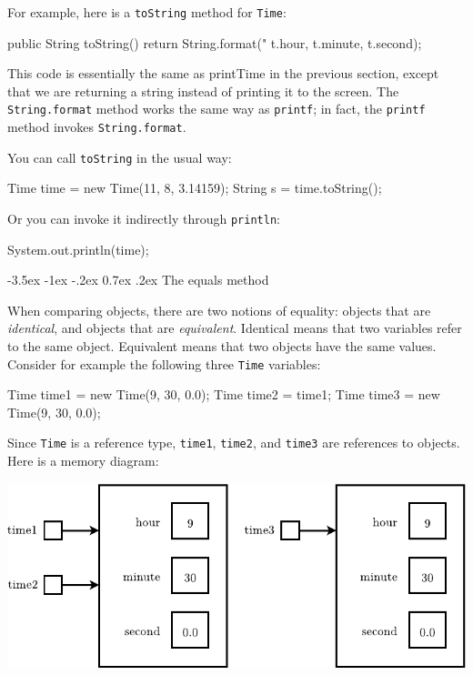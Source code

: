 \documentclass[12pt]{book}
\makeatletter
\theoremstyle{exercise}
\newcommand{\java}[1]{\verb"#1"}
\renewcommand{\section}{\@startsection {section}{1}{\z@}%
    {-3.5ex \@plus -1ex \@minus -.2ex}%
    {0.7ex \@plus.2ex}%
    {\normalfont\Large\bfseries}}
\newcommand{\java}[1]{\lstinline{#1}} %
\makeatother
\begin{document}
For example, here is a \java{toString} method for \java{Time}:

\begin{code}
public String toString() {
    return String.format("%
            t.hour, t.minute, t.second);
}
\end{code}

This code is essentially the same as printTime in the previous section, except that we are returning a string instead of printing it to the screen.
The \java{String.format} method works the same way as \java{printf}; in fact, the \java{printf} method invokes \java{String.format}.

You can call \java{toString} in the usual way:

\begin{code}
    Time time = new Time(11, 8, 3.14159);
    String s = time.toString();
\end{code}

Or you can invoke it indirectly through \java{println}:

\begin{code}
    System.out.println(time);
\end{code}


\section{The equals method}


When comparing objects, there are two notions of equality: objects that are {\em identical}, and objects that are {\em equivalent}.
Identical means that two variables refer to the same object.
Equivalent means that two objects have the same values.
Consider for example the following three \java{Time} variables:

\begin{code}
    Time time1 = new Time(9, 30, 0.0);
    Time time2 = time1;
    Time time3 = new Time(9, 30, 0.0);
\end{code}

Since \java{Time} is a reference type, \java{time1}, \java{time2}, and \java{time3} are references to objects.
Here is a memory diagram:

\begin{center}
\includegraphics{figs/time2.pdf}
\end{center}
\end{document}
